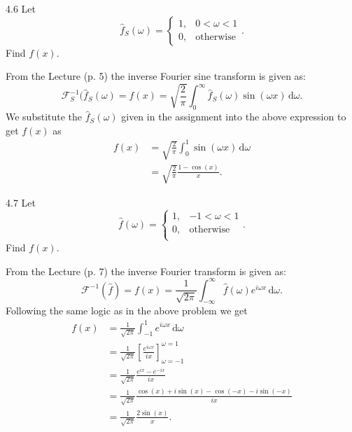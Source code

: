 \begin{problem}{4.6}
Let
\[ 
\hat{f}_S \left( \omega \right) = \begin{cases}
1, & 0 < \omega < 1 \\
0, & \text{otherwise}
\end{cases}
.\]
Find $f(x)$.
\end{problem}

\begin{derivation}
  From the Lecture (p. 5) the inverse Fourier sine transform is given as:
  \begin{equation*}
    \mathcal{F}_S^{-1}(\hat{f}_S(\omega) = f(x) = \sqrt{\frac{2}{\pi}} \int_{0}^{\infty} \hat{f}_S(\omega) \sin (\omega x) \, \mathrm{d}\omega
  .\end{equation*}
  We substitute the $\hat{f}_S(\omega)$ given in the assignment into the above expression to get $f(x)$ as
  \begin{align*}
    f(x) &= \sqrt{\frac{2}{\pi}} \int_{0}^{1} \sin (\omega x) \, \mathrm{d}\omega \\
         &= \sqrt{\frac{2}{\pi}} \frac{1 - \cos(x)}{x}
  .\end{align*}
\end{derivation}



\begin{problem}{4.7}
Let
\[ 
\hat{f} \left( \omega \right) = \begin{cases}
1, & -1 < \omega < 1 \\
0, & \text{otherwise} \\
\end{cases}
.\]
Find $f(x)$.
\end{problem}

\begin{derivation}
  From the Lecture (p. 7) the inverse Fourier transform is given as:
  \begin{equation*}
    \mathcal{F}^{-1}(\hat{f}) = f(x) = \frac{1}{\sqrt{2\pi}} \int_{-\infty}^{\infty} \hat{f}(\omega) e^{i \omega x} \, \mathrm{d}\omega
  .\end{equation*}
  Following the same logic as in the above problem we get
  \begin{align*}
    f(x) &= \frac{1}{\sqrt{2\pi}} \int_{-1}^{1} e^{i \omega x} \, \mathrm{d}\omega \\
    &= \frac{1}{\sqrt{2\pi}} \left[ \frac{e^{i \omega x}}{i x} \right]_{\omega = -1}^{\omega = 1} \\
    &= \frac{1}{\sqrt{2\pi}} \frac{e^{ix} - e^{-ix}}{ix} \\
    &= \frac{1}{\sqrt{2\pi}} \frac{\cos(x) + i \sin(x) - \cos(-x) - i \sin (-x)}{ix} \\
    &= \frac{1}{\sqrt{2\pi}} \frac{2\sin (x)}{x}
  .\end{align*}
\end{derivation}

